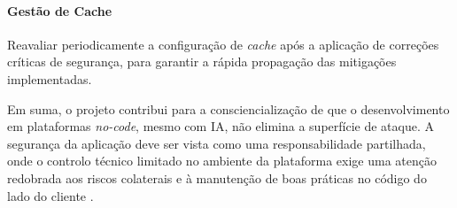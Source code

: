 \paragraph{Gestão de Cache}
Reavaliar periodicamente a configuração de \textit{cache} após a aplicação de correções críticas de segurança,
para garantir a rápida propagação das mitigações implementadas.

Em suma, o projeto contribui para a consciencialização de que o desenvolvimento em plataformas \textit{no-code}, mesmo com IA, não elimina a superfície de ataque.
A segurança da aplicação deve ser vista como uma responsabilidade partilhada,
onde o controlo técnico limitado no ambiente da plataforma exige uma atenção redobrada aos riscos colaterais
e à manutenção de boas práticas no código do lado do cliente \cite{ref51}.